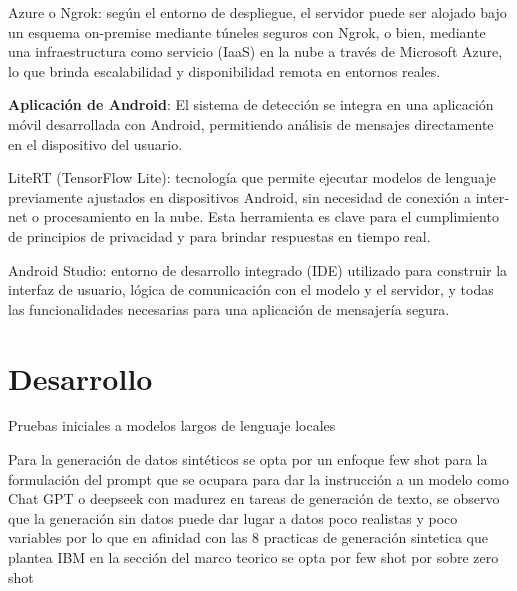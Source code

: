 \documentclass{article}
\begin{document}
\foreignlanguage{spanish}{Azure o Ngrok: seg{{\'{u}}}n el entorno de despliegue, el servidor puede ser alojado bajo un esquema on-premise mediante t{{\'{u}}}neles seguros con Ngrok, o bien, mediante una infraestructura como servicio (IaaS) en la nube a trav{\'{e}}s de Microsoft Azure, lo que brinda escalabilidad y disponibilidad remota en entornos reales.}

\textbf{Aplicaci{\'{o}}n de Android}: \foreignlanguage{spanish}{El sistema de detecci{\'{o}}n se integra en una aplicaci{\'{o}}n m{\'{o}}vil desarrollada con Android, permitiendo an{\'{a}}lisis de mensajes directamente en el dispositivo del usuario. }

\foreignlanguage{spanish}{LiteRT (TensorFlow Lite): tecnolog{\'{i}}a que permite ejecutar modelos de lenguaje previamente ajustados en dispositivos Android, sin necesidad de conexi{\'{o}}n a internet o procesamiento en la nube. Esta herramienta es clave para el cumplimiento de principios de privacidad y para brindar respuestas en tiempo real.}

\foreignlanguage{spanish}{Android Studio: entorno de desarrollo integrado (IDE) utilizado para construir la interfaz de usuario, l{\'{o}}gica de comunicaci{\'{o}}n con el modelo y el servidor, y todas las funcionalidades necesarias para una aplicaci{\'{o}}n de mensajer{\'{i}}a segura.}

\section{Desarrollo}



Pruebas iniciales a modelos largos de lenguaje locales 

Para la generación de datos sintéticos se opta por un enfoque few shot para la formulación del prompt que se ocupara para
dar la instrucción a un modelo como Chat GPT o deepseek con madurez en tareas de generación de texto, se observo que
la generación sin datos puede dar lugar a datos poco realistas y poco variables por lo que en afinidad con las 8 practicas de
generación sintetica que plantea IBM en la sección del marco teorico se opta por few shot por sobre zero shot
\end{document}
